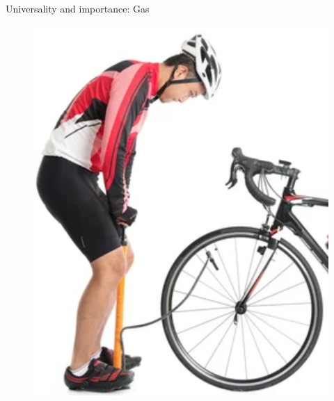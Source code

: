 \documentclass[usenames,dvipsnames]{beamer}
\begin{document}
\begin{frame}{\huge{Universality and importance: Gas}}
\begin{figure}
          \includegraphics[scale=0.2]{Images/tyre_bicycle.png}
      \end{figure}
\end{frame}

















\end{document}
